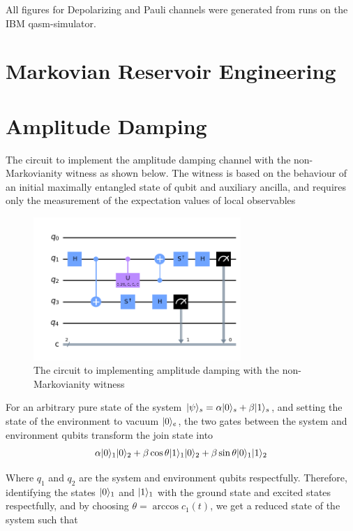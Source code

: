 \documentclass[12pt]{article}
\DeclarePairedDelimiter{\ket}{\lvert}{\rangle}
\begin{document}
All figures for Depolarizing and Pauli channels were generated from runs on the IBM qasm-simulator.

  \section{Markovian Reservoir Engineering}
  \blindtext

  \section{Amplitude Damping}
  The circuit to implement the amplitude damping channel with the non-Markovianity witness as shown below. The witness is based on the behaviour of an initial maximally entangled state of qubit and auxiliary ancilla, and requires only the measurement of the expectation values of local observables

  \begin{figure}[h]
    \centering
    \includegraphics[width=0.7\textwidth]{images/amplitude_damping_yy_circuit}
    \caption{The circuit to implementing amplitude damping with the non-Markovianity witness %
            \label{fig:amplitude_damping_circuit}}
  \end{figure}
  For an arbitrary pure state of the system $\ket{\psi}_{s} = \alpha\ket{0}_{s} + \beta\ket{1}_{s}$, and setting the state of the environment to vacuum $\ket{0}_{e}$, the two gates between the system and environment qubits transform the join state into 
  \begin{equation}
    \alpha\ket{0}_{1}\ket{0}_{2} + \beta\cos \theta \ket{1}_{1}\ket{0}_{2} + \beta\sin \theta \ket{0}_{1}\ket{1}_{2}
  \end{equation}

  Where $q_{1}$ and $q_{2}$ are the system and environment qubits respectfully. Therefore, identifying the states $\ket{0}_{1}$ and $\ket{1}_{1}$ with the ground state and excited states respectfully, and by choosing $\theta = \arccos c_{1}(t)$, we get a reduced state of the system such that
\end{document}
